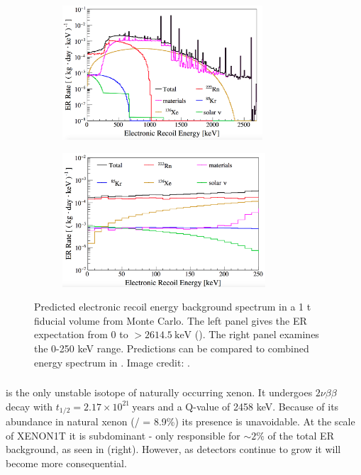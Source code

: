\begin{figure}
    \centering
    \begin{subfigure}[t]{0.5\textwidth}
        \centering
        \includegraphics[height=5cm]{ERRateMCFull}
    \end{subfigure}%
    \begin{subfigure}[t]{0.5\textwidth}
        \centering
        \includegraphics[height=5cm]{ERRateMCZoomed}
    \end{subfigure}
    \caption{Predicted electronic recoil energy background spectrum in a 1 t fiducial volume from Monte Carlo.  The left panel gives the
    ER expectation from 0 to $> 2614.5\ \mathrm{keV}$ ().  The right panel examines the 0-250 keV range.  Predictions can
    be compared to combined energy spectrum in .  Image credit:
    .}
	\label{fig:backgrounds_er_spectrum}
\end{figure}



\subsubsection{}
\label{subsubsec:backgrounds_electronic_xe}
 is the only unstable isotope of naturally occurring xenon.  It undergoes $2 \nu \beta \beta$ decay with
$t_{1/2} = 2.17 \times 10^{21}\ \mathrm{years}$  and a Q-value of 2458 keV.  Because of its abundance in natural
xenon (/ = 8.9\%) its presence is unavoidable.  At the scale of XENON1T it is subdominant - only responsible for
${\sim}2 \%$ of the total ER background, as seen in  (right).  However, as detectors continue to grow
it will become more consequential.



